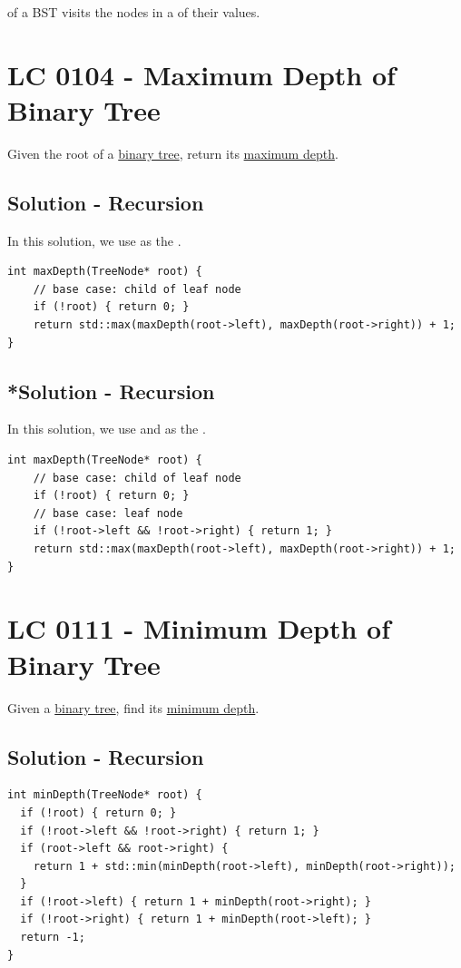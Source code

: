 {\color{blue}{In-order traversal}} of a BST visits the nodes in a {\color{blue}{non-decreasing order}} of their values.


\section{LC 0104 - Maximum Depth of Binary Tree}
Given the root of a \ul{binary tree}, return its \ul{maximum depth}.

\subsection*{Solution - Recursion}
In this solution, we use {\color{blue}{children of leaf nodes}} as the {\color{blue}{base cases}}.
\begin{lstlisting}
int maxDepth(TreeNode* root) {
	// base case: child of leaf node
	if (!root) { return 0; }
	return std::max(maxDepth(root->left), maxDepth(root->right)) + 1;
}
\end{lstlisting}

\subsection*{*Solution - Recursion}
In this solution, we use {\color{blue}{children of leaf nodes}} and {\color{blue}{leaf nodes}} as the {\color{blue}{base cases}}.
\begin{lstlisting}
int maxDepth(TreeNode* root) {
	// base case: child of leaf node
	if (!root) { return 0; }
	// base case: leaf node
	if (!root->left && !root->right) { return 1; }
	return std::max(maxDepth(root->left), maxDepth(root->right)) + 1;
}
\end{lstlisting}

\section{LC 0111 - Minimum Depth of Binary Tree}
Given a \ul{binary tree}, find its \ul{minimum depth}.

\subsection*{Solution - Recursion}
\begin{lstlisting}
int minDepth(TreeNode* root) {
  if (!root) { return 0; }
  if (!root->left && !root->right) { return 1; }
  if (root->left && root->right) {
    return 1 + std::min(minDepth(root->left), minDepth(root->right));
  }
  if (!root->left) { return 1 + minDepth(root->right); }
  if (!root->right) { return 1 + minDepth(root->left); }
  return -1;
}
\end{lstlisting}

